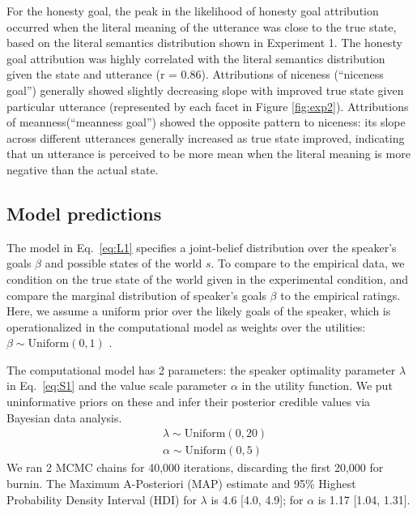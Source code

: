 \documentclass[10pt,letterpaper]{article}
\begin{document}
For the honesty goal, the peak in the likelihood of honesty goal attribution occurred when the literal meaning of the utterance was close to the true state, based on the literal semantics distribution shown in Experiment 1. The honesty goal attribution was highly correlated with the literal semantics distribution given the state and utterance (r = 0.86). Attributions of niceness (``niceness goal'') generally showed slightly decreasing slope with improved true state given particular utterance (represented by each facet in Figure \ref{fig:exp2}). Attributions of meanness(``meanness goal'') showed the opposite pattern to niceness: its slope across different utterances generally increased as true state improved, indicating that un utterance is perceived to be more mean when the literal meaning is more negative than the actual state.

\subsection{Model predictions}

The model in Eq.~\ref{eq:L1} specifies a joint-belief distribution over the speaker's goals $\beta$ and possible states of the world $s$.
To compare to the empirical data, we condition on the true state of the world given in the experimental condition, and compare the marginal distribution of speaker's goals $\beta$ to the empirical ratings.
Here, we assume a uniform prior over the likely goals of the speaker, which is operationalized in the computational model as weights over the utilities: $\beta \sim \text{Uniform}(0,1)$ .

The computational model has 2 parameters: the speaker optimality parameter $\lambda$ in Eq.~\ref{eq:S1} and the value scale parameter $\alpha$ in the utility function. 
We put uninformative priors on these and infer their posterior credible values  via Bayesian data analysis.
\begin{eqnarray*}
& \lambda \sim \text{Uniform}(0,20)\\
& \alpha \sim \text{Uniform}(0, 5)
\end{eqnarray*}
We ran 2 MCMC chains for 40,000 iterations, discarding the first 20,000 for burnin.
The Maximum A-Posteriori (MAP) estimate and 95\% Highest Probability Density Interval (HDI) for $\lambda$ is 4.6 [4.0, 4.9]; for $\alpha$ is 1.17 [1.04, 1.31].%
\end{document}
